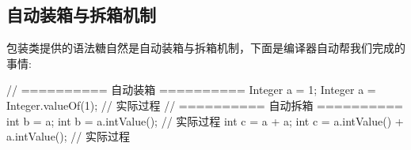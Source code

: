 \subsection{自动装箱与拆箱机制}

包装类提供的语法糖自然是自动装箱与拆箱机制，下面是编译器自动帮我们完成的事情:

\begin{Java}
// ========== 自动装箱 ==========
Integer a = 1;
Integer a = Integer.valueOf(1); // 实际过程
// ========== 自动拆箱 ==========
int b = a;
int b = a.intValue();           // 实际过程
int c = a + a;
int c = a.intValue() + a.intValue();    // 实际过程
\end{Java}

\newpage